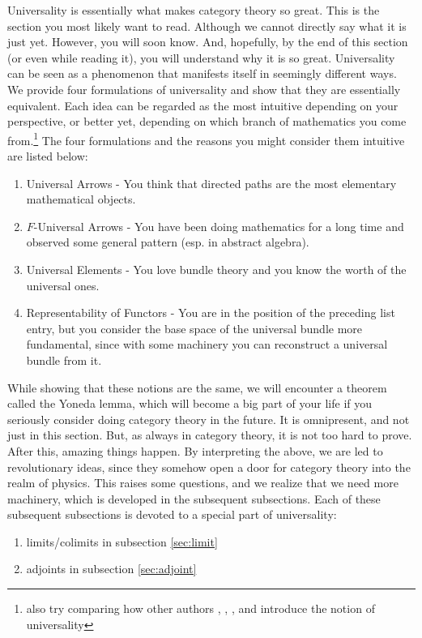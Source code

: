 Universality is essentially what makes category theory so great.
This is the section you most likely want to read.
Although we cannot directly say what it is just yet.
However, you will soon know.
And, hopefully, by the end of this section (or even while reading it), you will understand why it is so great.
Universality can be seen as a phenomenon that manifests itself in seemingly different ways.
We provide four formulations of universality and show that they are essentially equivalent.
Each idea can be regarded as the most intuitive depending on your perspective, or better yet, depending on which branch of mathematics you come from.\footnote{also try comparing how other authors \cite{e837ef86}, \cite{52fbba46}, \cite{dc6f686f}, and \cite{wiki-nlab0000} introduce the notion of universality}
The four formulations and the reasons you might consider them intuitive are listed below:
\begin{enumerate}
\item[(1)]
Universal Arrows - You think that directed paths are the most elementary mathematical objects.
\item[(2)]
$F$-Universal Arrows - You have been doing mathematics for a long time and observed some general pattern (esp.
in abstract algebra).
\item[(3)]
Universal Elements - You love bundle theory and you know the worth of the universal ones.
\item[(4)]
Representability of Functors - You are in the position of the preceding list entry, but you consider the base space of the universal bundle more fundamental, since with some machinery you can reconstruct a universal bundle from it.
\end{enumerate}
While showing that these notions are the same, we will encounter a theorem called the Yoneda lemma, which will become a big part of your life if you seriously consider doing category theory in the future.
It is omnipresent, and not just in this section.
But, as always in category theory, it is not too hard to prove.
After this, amazing things happen.
By interpreting the above, we are led to revolutionary ideas, since they somehow open a door for category theory into the realm of physics.
This raises some questions, and we realize that we need more machinery, which is developed in the subsequent subsections.
Each of these subsequent subsections is devoted to a special part of universality:
\begin{enumerate}
\item[$\bullet$]
limits/colimits in subsection \ref{sec:limit}
\item[$\bullet$]
adjoints in subsection \ref{sec:adjoint}
\end{enumerate}
